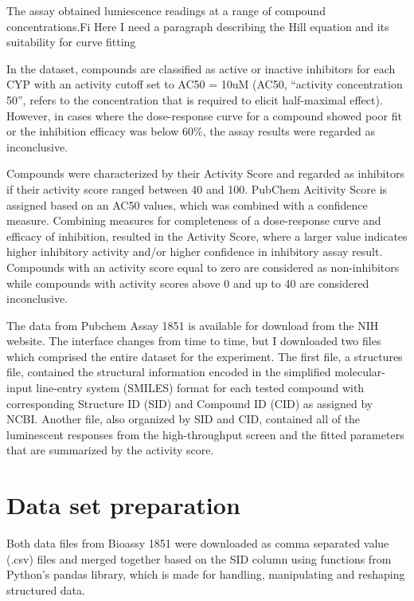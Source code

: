 The assay obtained lumiescence readings at a range of compound concentrations.Fi Here I need a paragraph describing the Hill equation and its suitability for curve fitting


In the dataset, compounds are classified as active or inactive inhibitors for each CYP with an activity cutoff set to AC50 = 10uM (AC50, “activity concentration 50”, refers to the concentration that is required to elicit half-maximal effect). However, in cases where the dose-response curve for a compound showed poor fit or the inhibition efficacy was below 60\%, the assay results were regarded as inconclusive.\cite{Lapins2013}

Compounds were characterized by their Activity Score and regarded as inhibitors if their activity score ranged between 40 and 100. PubChem Acitivity Score is assigned based on an AC50 values, which was combined with a confidence measure. Combining measures for completeness of a dose-response curve and efficacy of inhibition, resulted in the Activity Score, where a larger value indicates higher inhibitory activity and/or higher confidence in inhibitory assay result. Compounds with an activity score equal to zero are considered as non-inhibitors while compounds with activity scores above 0 and up to 40 are considered inconclusive. \cite{Lapins2013}

The data from Pubchem Assay 1851 is available for download from the NIH website. The interface changes from time to time, but I downloaded two files which comprised the entire dataset for the experiment. The first file, a structures file, contained the structural information encoded in the simplified molecular-input line-entry system (SMILES) format for each tested compound with corresponding Structure ID (SID) and Compound ID (CID) as assigned by NCBI. Another file, also organized by SID and CID, contained all of the luminescent responses from the high-throughput screen and the fitted parameters that are summarized by the activity score. 

\section{Data set preparation}

Both data files from Bioassy 1851 were downloaded as comma separated value (.csv) files and merged together based on the SID column using functions from Python's pandas library, which is made for handling, manipulating and reshaping structured data.

